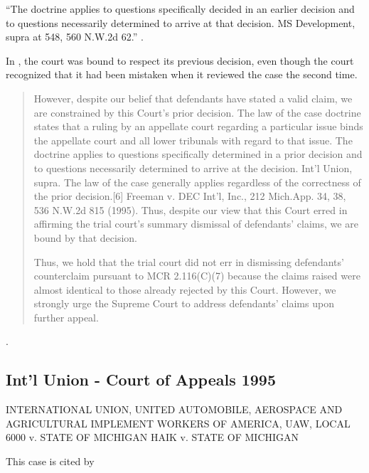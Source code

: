 \documentclass[12pt,\documentclassflag]{michiganCourtOfAppealsBrief}
\begin{document}
``The doctrine applies to questions specifically decided in an earlier decision and to questions necessarily determined to arrive at that decision. MS Development, supra at 548, 560 N.W.2d 62.'' .

In \cite{MS Development}, the court was bound to respect its previous decision, even though the court recognized that it had been mistaken when it reviewed the case the second time.

\begin{quotation}
  However, despite our belief that defendants have stated a valid claim, we are constrained by this Court's prior decision. The law of the case doctrine states that a ruling by an appellate court regarding a particular issue binds the appellate court and all lower tribunals with regard to that issue. The doctrine applies to questions specifically determined in a prior decision and to questions necessarily determined to arrive at the decision. Int'l Union, supra. The law of the case generally applies regardless of the correctness of the prior decision.[6] Freeman v. DEC Int'l, Inc., 212 Mich.App. 34, 38, 536 N.W.2d 815 (1995). Thus, despite our view that this Court erred in affirming the trial court's summary dismissal of defendants' claims, we are bound by that decision.

  Thus, we hold that the trial court did not err in dismissing defendants' counterclaim pursuant to MCR 2.116(C)(7) because the claims raised were almost identical to those already rejected by this Court. However, we strongly urge the Supreme Court to address defendants' claims upon further appeal.
\end{quotation}
. 

\subsection{Int'l Union - Court of Appeals 1995}

INTERNATIONAL UNION, UNITED AUTOMOBILE, AEROSPACE AND AGRICULTURAL IMPLEMENT WORKERS OF AMERICA, UAW, LOCAL 6000
v.
STATE OF MICHIGAN
HAIK
v.
STATE OF MICHIGAN

This case is cited by 
\end{document}
